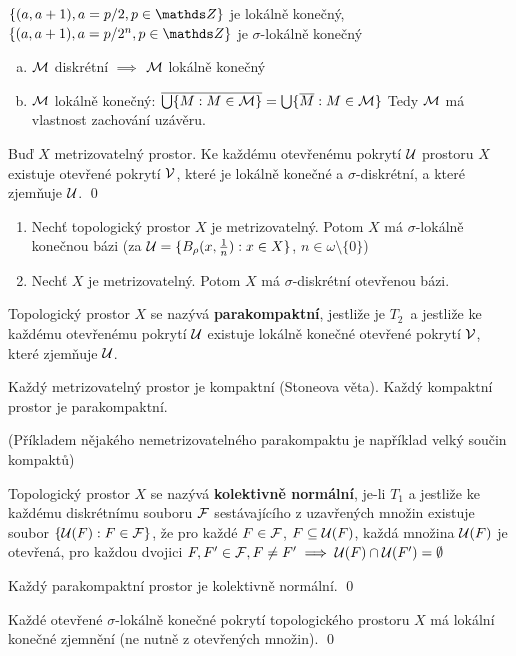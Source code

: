 \documentclass[12pt,a4paper]{article}
\newcommand{\head}[1]{\medskip\noindent {\bf #1}}
\newcommand\Hausd{$T_2$}
\newcommand\close{\overline}
\begin{document}
\priklad $\{(a, a+1), a = p / 2, p \in \Z\}$ je lokálně konečný, $\{(a, a+1), a = p / 2^n, p \in \Z\}$ je $\sigma$-lokálně konečný

\poznamka
\begin{enumerate}[(a)]
	\item $\mathcal{ M }$ diskrétní $\implies$ $\mathcal{ M }$ lokálně konečný
	\item $\mathcal{ M }$ lokálně konečný: $\close{\bigcup \{M : M \in \p M\}} = \bigcup \{\close M : M \in \p M\}$ Tedy $\mathcal{ M }$ má vlastnost zachování uzávěru.
\end{enumerate}

\veta[A. H. Stone]
	Buď $X$ metrizovatelný prostor. Ke každému otevřenému pokrytí $\mathcal{ U }$
	prostoru $X$ existuje otevřené pokrytí $\mathcal{ V }$, které je lokálně konečné a
	$\sigma$-diskrétní, a které zjemňuje $\mathcal{ U }$.
\dukaz \qed

\head{Důsledky:}
\begin{enumerate}
	\item Nechť topologický prostor $X$ je metrizovatelný. Potom $X$ má
	$\sigma$-lokálně konečnou bázi (za $\mathcal{ U }=\{B_\rho(x, \frac{1}{n}) : x \in
	X\}$, $n \in \omega \setminus \{0\}$)

	\item Nechť $X$ je metrizovatelný. Potom $X$ má $\sigma$-diskrétní
		otevřenou bázi.
\end{enumerate}

 Topologický prostor $X$ se nazývá {\bf parakompaktní}, jestliže je
	\Hausd~a jestliže ke každému otevřenému pokrytí $\mathcal{ U }$ existuje lokálně
	konečné otevřené pokrytí $\mathcal{ V }$, které zjemňuje $\mathcal{ U }$.

\priklad Každý metrizovatelný prostor je kompaktní (Stoneova věta). Každý
	kompaktní prostor je parakompaktní.

(Příkladem nějakého nemetrizovatelného parakompaktu je například velký součin
kompaktů)

 Topologický prostor $X$ se nazývá {\bf kolektivně normální}, je-li
	$T_1$ a jestliže ke každému diskrétnímu souboru $\mathcal{ F }$ sestávajícího z
	uzavřených množin existuje soubor $\{\mathcal{ U }(F) : F \in \mathcal{ F }\}$, že pro každé
	$F \in \mathcal{ F }$, $F \subseteq \mathcal{ U }(F)$, každá množina $\mathcal{ U }(F)$ je otevřená,
	pro každou dvojici $F, F' \in \mathcal{ F }, F \neq F' \implies \mathcal{ U }(F) \cap \mathcal{ U }(F') = \emptyset$

\veta Každý parakompaktní prostor je kolektivně normální.
\dukaz \qed

\lemma[1] Každé otevřené $\sigma$-lokálně konečné pokrytí topologického
	prostoru $X$ má lokální konečné zjemnění (ne nutně z otevřených množin).
\dukaz \qed
\end{document}
